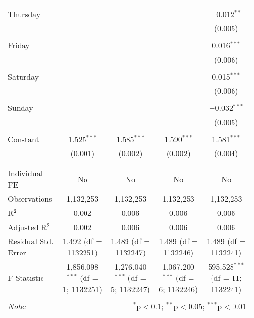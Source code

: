 \documentclass[
]{article}
\begin{document}
\begin{table}[!htbp]
{\begin{tabular}{@{\extracolsep{5pt}}lcccc}
  & & & & \\ 
 Thursday &  &  &  & $-$0.012$^{**}$ \\ 
  &  &  &  & (0.005) \\ 
  & & & & \\ 
 Friday &  &  &  & 0.016$^{***}$ \\ 
  &  &  &  & (0.006) \\ 
  & & & & \\ 
 Saturday &  &  &  & 0.015$^{***}$ \\ 
  &  &  &  & (0.006) \\ 
  & & & & \\ 
 Sunday &  &  &  & $-$0.032$^{***}$ \\ 
  &  &  &  & (0.005) \\ 
  & & & & \\ 
 Constant & 1.525$^{***}$ & 1.585$^{***}$ & 1.590$^{***}$ & 1.581$^{***}$ \\ 
  & (0.001) & (0.002) & (0.002) & (0.004) \\ 
  & & & & \\ 
\hline \\[-1.8ex] 
Individual FE & No & No & No & No \\ 
Observations & 1,132,253 & 1,132,253 & 1,132,253 & 1,132,253 \\ 
R$^{2}$ & 0.002 & 0.006 & 0.006 & 0.006 \\ 
Adjusted R$^{2}$ & 0.002 & 0.006 & 0.006 & 0.006 \\ 
Residual Std. Error & 1.492 (df = 1132251) & 1.489 (df = 1132247) & 1.489 (df = 1132246) & 1.489 (df = 1132241) \\ 
F Statistic & 1,856.098$^{***}$ (df = 1; 1132251) & 1,276.040$^{***}$ (df = 5; 1132247) & 1,067.200$^{***}$ (df = 6; 1132246) & 595.528$^{***}$ (df = 11; 1132241) \\ 
\hline 
\hline \\[-1.8ex] 
\textit{Note:}  & \multicolumn{4}{r}{$^{*}$p$<$0.1; $^{**}$p$<$0.05; $^{***}$p$<$0.01} \\ 
\end{tabular}
} 
\end{table} 
\newpage
\end{document}
